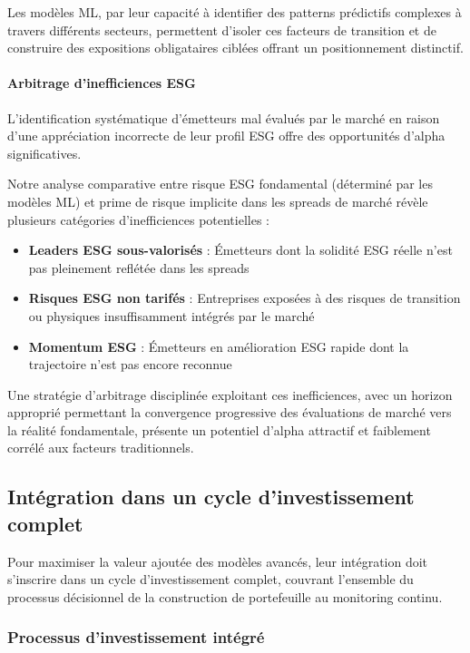 Les modèles ML, par leur capacité à identifier des patterns prédictifs complexes à travers différents secteurs, permettent d'isoler ces facteurs de transition et de construire des expositions obligataires ciblées offrant un positionnement distinctif.

\paragraph{Arbitrage d'inefficiences ESG}

L'identification systématique d'émetteurs mal évalués par le marché en raison d'une appréciation incorrecte de leur profil ESG offre des opportunités d'alpha significatives.

Notre analyse comparative entre risque ESG fondamental (déterminé par les modèles ML) et prime de risque implicite dans les spreads de marché révèle plusieurs catégories d'inefficiences potentielles :
\begin{itemize}
    \item \textbf{Leaders ESG sous-valorisés} : Émetteurs dont la solidité ESG réelle n'est pas pleinement reflétée dans les spreads
    \item \textbf{Risques ESG non tarifés} : Entreprises exposées à des risques de transition ou physiques insuffisamment intégrés par le marché
    \item \textbf{Momentum ESG} : Émetteurs en amélioration ESG rapide dont la trajectoire n'est pas encore reconnue
\end{itemize}

Une stratégie d'arbitrage disciplinée exploitant ces inefficiences, avec un horizon approprié permettant la convergence progressive des évaluations de marché vers la réalité fondamentale, présente un potentiel d'alpha attractif et faiblement corrélé aux facteurs traditionnels.

\subsection{Intégration dans un cycle d'investissement complet}

Pour maximiser la valeur ajoutée des modèles avancés, leur intégration doit s'inscrire dans un cycle d'investissement complet, couvrant l'ensemble du processus décisionnel de la construction de portefeuille au monitoring continu.

\subsubsection{Processus d'investissement intégré}

